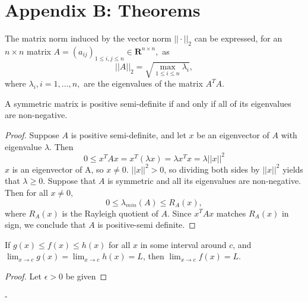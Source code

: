 \section{Appendix B: Theorems}
\begin{theorem}\label{spectral norm}
\textnormal{\cite[3]{matrixnorms}}
The matrix norm induced by the vector norm $||\cdot||_{2}$ can be expressed, for an $n\times n$ matrix $A = (a_{ij})_{1\leq i,j \leq n} \in \mathbf{R}^{n\times n},$ as $$||A||_{2}=\sqrt{\underset{1 \leq i \leq n}{\max}\lambda_{i}},$$
where $\lambda_{i}, i=1,\ldots,n,$ are the \textnormal{eigenvalues} of the matrix $A^{T}A.$
\end{theorem}

\begin{theorem}\label{SPD_e}
    A symmetric matrix is positive semi-definite if and only if all of its eigenvalues are non-negative. 
\end{theorem}
\begin{proof}
Suppose $A$ is positive semi-definite, and let $x$ be an eigenvector of $A$ with eigenvalue $\lambda.$ Then $$0\leq x^{T}Ax = x^{T}(\lambda x) = \lambda x^{T}x = \lambda ||x||^{2}$$
$x$ is an eigenvector of A, so $x\neq 0$. $||x||^{2}> 0$, so dividing both sides by $||x||^{2}$ yields that $\lambda \geq 0.$ Suppose that $A$ is symmetric and all its eigenvalues are non-negative. Then for all $x\neq 0,$
$$0\leq \lambda_{min}(A)\leq R_{A}(x),$$
where $R_{A}(x)$ is the Rayleigh quotient of $A.$ Since $x^{T}Ax$ matches $R_{A}(x)$ in sign, we conclude that $A$ is positive-semi definite.
\end{proof}

\begin{theorem}\label{squeeze_theorem}
    If $g(x) \leq f(x) \leq h(x)$ for all $x$ in some interval around $c$, and $\lim_{x\to c} g(x) = \lim_{x\to c} h(x) = L$, then $\lim_{x\to c} f(x) = L$.
\end{theorem}
\begin{proof}
Let $\epsilon > 0$ be given
\end{proof}













-